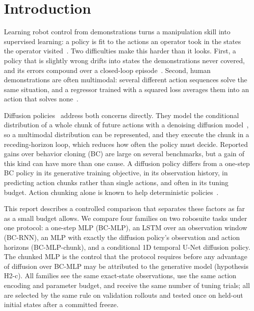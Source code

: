 \section{Introduction}
\label{sec:intro}

Learning robot control from demonstrations turns a manipulation skill into supervised
learning: a policy is fit to the actions an operator took in the states the operator
visited~\citep{argall2009survey,pomerleau1991}. Two difficulties make this harder than it
looks. First, a policy that is slightly wrong drifts into states the demonstrations never
covered, and its errors compound over a closed-loop episode~\citep{ross2011dagger}. Second,
human demonstrations are often multimodal: several different action sequences solve the
same situation, and a regressor trained with a squared loss averages them into an action
that solves none~\citep{florence2021ibc,shafiullah2022bet}.

Diffusion policies~\citep{chi2023diffusion} address both concerns directly. They model the
conditional distribution of a whole chunk of future actions with a denoising diffusion
model~\citep{ho2020ddpm}, so a multimodal distribution can be represented, and they execute
the chunk in a receding-horizon loop, which reduces how often the policy must decide.
Reported gains over behavior cloning (BC) are large on several benchmarks, but a gain of
this kind can have more than one cause. A diffusion policy differs from a one-step BC
policy in its generative training objective, in its observation history, in predicting
action chunks rather than single actions, and often in its tuning budget. Action
chunking alone is known to help deterministic policies~\citep{zhao2023act}.

This report describes a controlled comparison that separates these factors as far as a
small budget allows. We compare four families on two robosuite tasks under one protocol:
a one-step MLP (BC-MLP), an LSTM over an observation window (BC-RNN), an MLP with exactly
the diffusion policy's observation and action horizons (BC-MLP-chunk), and a conditional 1D
temporal U-Net diffusion policy. The chunked MLP is the control that the protocol requires
before any advantage of diffusion over BC-MLP may be attributed to the generative model
(hypothesis H2-c). All families see the same exact-state observations, use the same action
encoding and parameter budget, and receive the same number of tuning trials; all are
selected by the same rule on validation rollouts and tested once on held-out initial
states after a committed freeze.

